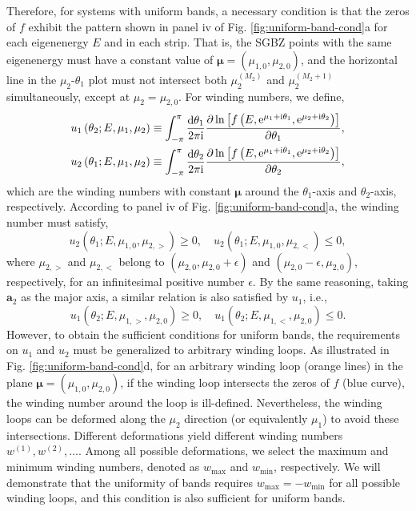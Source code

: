 \documentclass[pdflatex,sn-nature, iicol]{sn-jnl}%
\theoremstyle{thmstyleone}%
\theoremstyle{thmstyletwo}%
\theoremstyle{thmstylethree}%
\begin{document}
Therefore, for systems with uniform bands, a necessary condition is
that the zeros of $f$ exhibit the pattern shown in panel iv of Fig.
\ref{fig:uniform-band-cond}a for each eigenenergy $E$ and in each
strip. That is, the SGBZ points with the same eigenenergy must have
a constant value of $\boldsymbol{\mu}=(\mu_{1,0},\mu_{2,0})$, and
the horizontal line in the $\mu_{2}$-$\theta_{1}$ plot must not
intersect both $\mu_{2}^{(M_{2})}$ and $\mu_{2}^{(M_{2}+1)}$ simultaneously,
except at $\mu_{2}=\mu_{2,0}$. For winding numbers, we define, 
\begin{align}
u_{1}\left(\theta_{2};E,\mu_{1},\mu_{2}\right) & \equiv\int_{-\pi}^{\pi}\frac{\mathrm{d}\theta_{1}}{2\pi\mathrm{i}}\frac{\partial\ln\left[f\left(E,\mathrm{e}^{\mu_{1}+\mathrm{i}\theta_{1}},\mathrm{e}^{\mu_{2}+\mathrm{i}\theta_{2}}\right)\right]}{\partial\theta_{1}},\\
u_{2}\left(\theta_{1};E,\mu_{1},\mu_{2}\right) & \equiv\int_{-\pi}^{\pi}\frac{\mathrm{d}\theta_{2}}{2\pi\mathrm{i}}\frac{\partial\ln\left[f\left(E,\mathrm{e}^{\mu_{1}+\mathrm{i}\theta_{1}},\mathrm{e}^{\mu_{2}+\mathrm{i}\theta_{2}}\right)\right]}{\partial\theta_{2}},
\end{align}
which are the winding numbers with constant $\boldsymbol{\mu}$ around
the $\theta_{1}$-axis and $\theta_{2}$-axis, respectively. According
to panel iv of Fig. \ref{fig:uniform-band-cond}a, the winding number
must satisfy, 
\begin{equation}
u_{2}\left(\theta_{1};E,\mu_{1,0},\mu_{2,>}\right)\geq0,\quad u_{2}\left(\theta_{1};E,\mu_{1,0},\mu_{2,<}\right)\leq0,
\end{equation}
where $\mu_{2,>}$ and $\mu_{2,<}$ belong to $(\mu_{2,0},\mu_{2,0}+\epsilon)$
and $(\mu_{2,0}-\epsilon,\mu_{2,0})$, respectively, for an infinitesimal
positive number $\epsilon$. By the same reasoning, taking $\mathbf{a}_{2}$
as the major axis, a similar relation is also satisfied by $u_{1}$,
i.e., 
\begin{equation}
u_{1}\left(\theta_{2};E,\mu_{1,>},\mu_{2,0}\right)\geq0,\quad u_{1}\left(\theta_{2};E,\mu_{1,<},\mu_{2,0}\right)\leq0.
\end{equation}
However, to obtain the sufficient conditions for uniform bands, the
requirements on $u_{1}$ and $u_{2}$ must be generalized to arbitrary
winding loops. As illustrated in Fig. \ref{fig:uniform-band-cond}d,
for an arbitrary winding loop (orange lines) in the plane $\boldsymbol{\mu}=(\mu_{1,0},\mu_{2,0})$,
if the winding loop intersects the zeros of $f$ (blue curve), the
winding number around the loop is ill-defined. Nevertheless, the winding
loops can be deformed along the $\mu_{2}$ direction (or equivalently
$\mu_{1}$) to avoid these intersections. Different deformations yield
different winding numbers $w^{(1)},w^{(2)},\dots$. Among all possible
deformations, we select the maximum and minimum winding numbers, denoted
as $w_{\text{max}}$ and $w_{\text{min}}$, respectively. We will
demonstrate that the uniformity of bands requires $w_{\text{max}}=-w_{\text{min}}$
for all possible winding loops, and this condition is also sufficient
for uniform bands.
\end{document}
